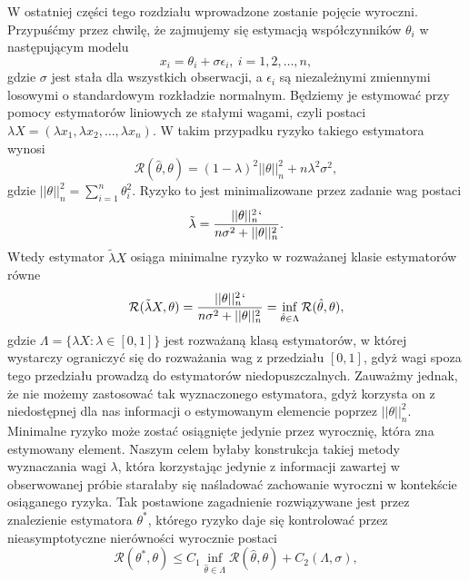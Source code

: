 \documentclass[man,mfiu]{mgrwms}
\begin{document}
W ostatniej części tego rozdziału wprowadzone zostanie pojęcie wyroczni. Przypuśćmy przez chwilę, że zajmujemy się estymacją współczynników $\theta_i$ w następującym modelu 
\begin{displaymath}
x_i=\theta_i+\sigma\epsilon_i,\ i=1,2,\dots,n,
\end{displaymath}
gdzie $\sigma$ jest stała dla wszystkich obserwacji, a $\epsilon_i$ są niezależnymi zmiennymi losowymi o standardowym rozkładzie normalnym. Będziemy je estymować przy pomocy estymatorów liniowych ze stałymi wagami, czyli postaci $\lambda X=(\lambda x_1,\lambda x_2,\dots, \lambda x_n)$. W takim przypadku ryzyko takiego estymatora wynosi 
\begin{displaymath}
\mathcal{R}(\hat{\theta},\theta)=(1-\lambda)^2||\theta||^2_n+n\lambda^2\sigma^2,
\end{displaymath}
gdzie $||\theta||_n^2=\sum_{i=1}^n\theta_i^2$. Ryzyko to jest minimalizowane przez zadanie wag postaci
\begin{displaymath}
\tilde{\lambda}=\frac{||\theta||^2_n`}{n\sigma^2+||\theta||^2_n}.
\end{displaymath}
Wtedy estymator $\tilde{\lambda}X$ osiąga minimalne ryzyko w rozważanej klasie estymatorów równe
\begin{displaymath}
\mathcal{R}(\tilde{\lambda}X,\theta)=\frac{||\theta||^2_n`}{n\sigma^2+||\theta||^2_n}=\inf_{\hat{\theta} \in \Lambda}\mathcal{R}(\hat{\theta},\theta),
\end{displaymath}
gdzie $\Lambda=\{\lambda X\colon \lambda\in [0,1]\}$ jest rozważaną klasą estymatorów, w której wystarczy ograniczyć się do rozważania wag z przedziału $[0,1]$, gdyż wagi spoza tego przedziału prowadzą do estymatorów niedopuszczalnych. Zauważmy jednak, że nie możemy zastosować tak wyznaczonego estymatora, gdyż korzysta on z niedostępnej dla nas informacji o estymowanym elemencie poprzez $||\theta||_n^2$. Minimalne ryzyko może zostać osiągnięte jedynie przez wyrocznię, która zna estymowany element. Naszym celem byłaby konstrukcja takiej metody wyznaczania wagi $\lambda$, która korzystając jedynie z informacji zawartej w obserwowanej próbie starałaby się naśladować zachowanie wyroczni w kontekście osiąganego ryzyka. Tak postawione zagadnienie rozwiązywane jest przez znalezienie estymatora $\theta^*$, którego ryzyko daje się kontrolować przez nieasymptotyczne nierówności wyrocznie postaci 
\begin{equation}\label{oracle}
\mathcal{R}(\theta^*,\theta)\leq C_1 \inf_{\hat{\theta} \in \Lambda}\mathcal{R}(\hat{\theta},\theta)+C_2(\Lambda,\sigma), 
\end{equation}
\end{document}
